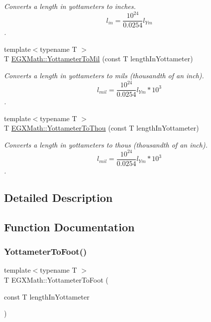 \begin{DoxyCompactItemize}
\begin{DoxyCompactList}\small\item\em Converts a length in yottameters to inches. \[ l_{in}= \frac{10^{24}}{0.0254} l_{Ym} \]. \end{DoxyCompactList}\item 
{\footnotesize template$<$typename T $>$ }\\T \mbox{\hyperlink{group___e_g_x_math-_conversions-_length_conversions-_yottameter-_imperial_ga71ee7b2256fffaec2663bd2eafc30a9d}{E\+G\+X\+Math\+::\+Yottameter\+To\+Mil}} (const T length\+In\+Yottameter)
\begin{DoxyCompactList}\small\item\em Converts a length in yottameters to mils (thousandth of an inch). \[ l_{mil}= \frac{10^{24}}{0.0254} l_{Ym} * 10^{3} \]. \end{DoxyCompactList}\item 
{\footnotesize template$<$typename T $>$ }\\T \mbox{\hyperlink{group___e_g_x_math-_conversions-_length_conversions-_yottameter-_imperial_ga9bf8eeca799b8246932d4aeaac425d87}{E\+G\+X\+Math\+::\+Yottameter\+To\+Thou}} (const T length\+In\+Yottameter)
\begin{DoxyCompactList}\small\item\em Converts a length in yottameters to thous (thousandth of an inch). \[ l_{mil}= \frac{10^{24}}{0.0254} l_{Ym} * 10^{3} \]. \end{DoxyCompactList}\end{DoxyCompactItemize}


\subsection{Detailed Description}


\subsection{Function Documentation}
\mbox{\label{group___e_g_x_math-_conversions-_length_conversions-_yottameter-_imperial_gae693078fe8f9b2ca717732916dcf28d7}} 
\subsubsection{\texorpdfstring{Yottameter\+To\+Foot()}{YottameterToFoot()}}
{\footnotesize\ttfamily template$<$typename T $>$ \\
T E\+G\+X\+Math\+::\+Yottameter\+To\+Foot (\begin{DoxyParamCaption}\item[{const T}]{length\+In\+Yottameter }\end{DoxyParamCaption})}



